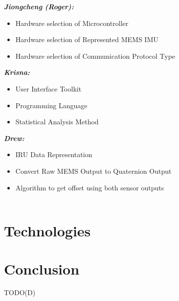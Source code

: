 \documentclass[letterpaper,10pt,onecolumn]{IEEEtran}
\begin{document}
\textit{\textbf{Jiongcheng (Roger):}}
\begin{itemize}
	\item Hardware selection of Microcontroller
	\item Hardware selection of Represented MEMS IMU
	\item Hardware selection of Communication Protocol Type
\end{itemize}

\textit{\textbf{Krisna:}}
\begin{itemize}
	\item User Interface Toolkit
	\item Programming Language
	\item Statistical Analysis Method
\end{itemize}

\textit{\textbf{Drew:}}
\begin{itemize}
	\item IRU Data Representation
	\item Convert Raw MEMS Output to Quaternion Output
	\item Algorithm to get offset using both sensor outputs\\\\
\end{itemize}



\section{Technologies}
	
	
	

\section{Conclusion}
TODO(D)


\newpage
\nocite{*}


\end{document}
